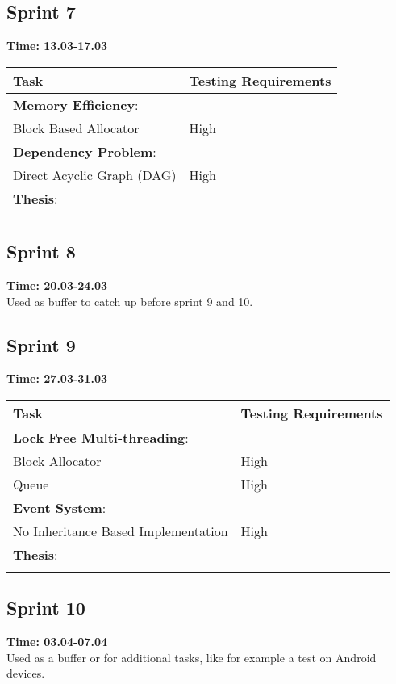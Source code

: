 \documentclass[hidelinks]{article}
\begin{document}
\subsection{Sprint 7}
\textbf{Time: 13.03-17.03}\\
\begin{tabularx}{\textwidth}{l >{\centering\arraybackslash}X}
\hline\noalign{\smallskip}
  Task                              & Testing Requirements   \\
\hline\noalign{\smallskip}
  \textbf{Memory Efficiency}:       &                        \\
  Block Based Allocator             & High                   \\
  
  \textbf{Dependency Problem}:      &                        \\ 
  Direct Acyclic Graph (DAG)        & High                   \\

  \textbf{Thesis}:                  &                        \\
\hline\noalign{\smallskip}
\end{tabularx}

\subsection{Sprint 8}
\textbf{Time: 20.03-24.03}\\
Used as buffer to catch up before sprint 9 and 10.

\subsection{Sprint 9}
\textbf{Time: 27.03-31.03}\\
\begin{tabularx}{\textwidth}{l >{\centering\arraybackslash}X}
\hline\noalign{\smallskip}
  Task                                & Testing Requirements   \\
\hline\noalign{\smallskip}
  \textbf{Lock Free Multi-threading}: &                        \\
  Block Allocator                     & High                   \\
  Queue                               & High                   \\
  
  \textbf{Event System}:              &                        \\ 
  No Inheritance Based Implementation & High                   \\

  \textbf{Thesis}:                    &                        \\
\hline\noalign{\smallskip}
\end{tabularx}

\subsection{Sprint 10}
\textbf{Time: 03.04-07.04}\\
Used as a buffer or for additional tasks, like for example a test on Android devices.
\end{document}
